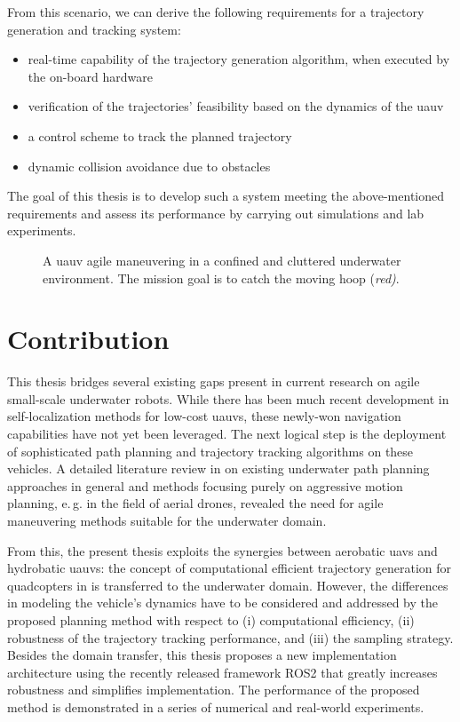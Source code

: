 From this scenario, we can derive the following requirements for a trajectory generation and tracking system:
\begin{itemize}
    \item real-time capability of the trajectory generation algorithm, when executed by the on-board hardware
    \item verification of the trajectories' feasibility based on the dynamics of the \ac{uauv}
    \item a control scheme to track the planned trajectory
    \item dynamic collision avoidance due to obstacles
\end{itemize}

The goal of this thesis is to develop such a system meeting the above-mentioned requirements and assess its performance by carrying out simulations and lab experiments.

\begin{figure}
    \centering
    
    \caption{A \ac{uauv} agile maneuvering in a confined and cluttered underwater environment. The mission goal is to catch the moving hoop (\textit{red)}.}
    \label{fig:agile_maneuvering_motivation}
\end{figure}


\section{Contribution}
This thesis bridges several existing gaps present in current research on agile small-scale underwater robots. While there has been much recent development in self-localization methods for low-cost \acp{uauv}, these newly-won navigation capabilities have not yet been leveraged. The next logical step is the deployment of sophisticated path planning and trajectory tracking algorithms on these vehicles. %
A detailed literature review in  on existing underwater path planning approaches in general and methods focusing purely on aggressive motion planning, e.\,g. in the field of aerial drones, revealed the need for agile maneuvering methods suitable for the underwater domain. 

From this, the present thesis exploits the synergies between aerobatic \acp{uav} and hydrobatic \acp{uauv}:  the concept of computational efficient trajectory generation for quadcopters in \cite{MuellerHehn15} is transferred to the underwater domain.
However, the differences in modeling the vehicle's dynamics have to be considered and addressed by the proposed planning method with respect to (i) computational efficiency, (ii) robustness of the trajectory tracking performance, and (iii) the sampling strategy. %
Besides the domain transfer, this thesis proposes a new implementation architecture using the recently released framework ROS2 that greatly increases robustness and simplifies implementation.
The performance of the proposed method is demonstrated in a series of numerical and real-world experiments.


